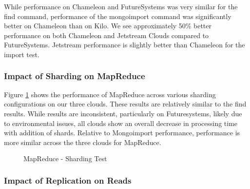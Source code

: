 \documentclass[sigconf]{acmart}
\begin{document}
While performance on Chameleon and FutureSystems was very similar for
the find command, performance of the mongoimport command was
significantly better on Chameleon than on Kilo.  We see approximately
50\% better performance on both Chameleon and Jetstream Clouds
compared to FutureSystems. Jetstream performance is slightly better
than Chameleon for the import test.


\subsubsection{Impact of Sharding on MapReduce}



Figure \ref{fig:shard-mapreduce} shows the performance of MapReduce
across various sharding configurations on our three clouds.  These
results are relatively similar to the find results.  While results are
inconsistent, particularly on Futuresystems, likely due to
environmental issues, all clouds show an overall decrease in
processing time with addition of shards.  Relative to Mongoimport
performance, performance is more similar across the three clouds for
MapReduce.

\begin{figure}[htbp]
\centering
{}
\caption{MapReduce - Sharding Test}
\label{fig:shard-mapreduce}
\end{figure}


\subsubsection{Impact of Replication on Reads}
\end{document}
